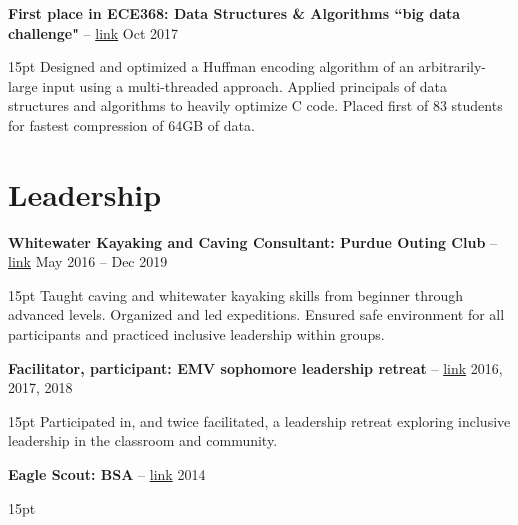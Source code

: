 \documentclass[10pt,letterpaper]{article}
\newcommand{\resumeItem}[4]{
	\begingroup
	\def\link{#2}
	\textbf{#1}
	\ifx\link\empty \else 
		-- \href{#2}{link}
	\fi
	\hfill #3\\
	\begin{adjustwidth}{15pt}{}
	#4
	\end{adjustwidth}
	\endgroup
}
\begin{document}
\resumeItem
{First place in ECE368: Data Structures \& Algorithms ``big data challenge"}
{}
{Oct 2017}
{Designed and optimized a Huffman encoding algorithm of an arbitrarily-large input using a multi-threaded approach. Applied principals of data structures and algorithms to heavily optimize C code. Placed first of 83 students for fastest compression of 64GB of data.}


\section*{Leadership}
\resumeItem
{Whitewater Kayaking and Caving Consultant: Purdue Outing Club}
{}
{May 2016 -- Dec 2019}
{Taught caving and whitewater kayaking skills from beginner through advanced levels. Organized and led expeditions. Ensured safe environment for all participants and practiced inclusive leadership within groups.}

\resumeItem
{Facilitator, participant: EMV sophomore leadership retreat}
{}
{2016, 2017, 2018}
{Participated in, and twice facilitated, a leadership retreat exploring inclusive leadership in the classroom and community.}

\resumeItem
{Eagle Scout: BSA}
{}
{2014}
{}
\end{document}
